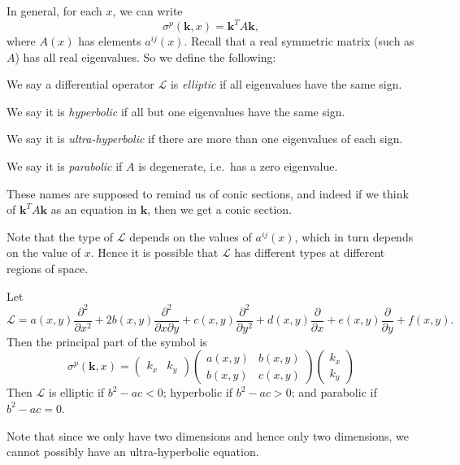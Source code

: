 \documentclass[a4paper]{article}
\begin{document}
In general, for each $x$, we can write
\[
  \sigma^p (\mathbf{k}, x) = \mathbf{k}^T A\mathbf{k},
\]
where $A(x)$ has elements $a^{ij}(x)$. Recall that a real symmetric matrix (such as $A$) has all real eigenvalues. So we define the following:

\begin{defi}
  We say a differential operator $\mathcal{L}$ is \emph{elliptic} if all eigenvalues have the same sign.

  We say it is \emph{hyperbolic} if all but one eigenvalues have the same sign.

  We say it is \emph{ultra-hyperbolic} if there are more than one eigenvalues of each sign.

  We say it is \emph{parabolic} if $A$ is degenerate, i.e.\ has a zero eigenvalue.
\end{defi}
These names are supposed to remind us of conic sections, and indeed if we think of $\mathbf{k}^T A\mathbf{k}$ as an equation in $\mathbf{k}$, then we get a conic section.

Note that the type of $\mathcal{L}$ depends on the values of $a^{ij}(x)$, which in turn depends on the value of $x$. Hence it is possible that $\mathcal{L}$ has different types at different regions of space.

\begin{eg}
  Let
  \[
    \mathcal{L} = a(x, y) \frac{\partial^2}{\partial x^2} + 2b(x, y) \frac{\partial^2}{\partial x \partial y} + c(x, y) \frac{\partial^2}{\partial y^2} + d(x, y) \frac{\partial}{\partial x} + e(x, y) \frac{\partial}{\partial y} + f(x, y).
  \]
  Then the principal part of the symbol is
  \[
    \sigma^p(\mathbf{k}, x) =
    \begin{pmatrix}
      k_x & k_y
    \end{pmatrix}
    \begin{pmatrix}
      a(x, y) & b(x, y)\\
      b(x, y) & c(x, y)
    \end{pmatrix}
    \begin{pmatrix}
      k_x \\ k_y
    \end{pmatrix}
  \]
  Then $\mathcal{L}$ is elliptic if $b^2 - ac < 0$; hyperbolic if $b^2 - ac > 0$; and parabolic if $b^2 - ac = 0$.

  Note that since we only have two dimensions and hence only two dimensions, we cannot possibly have an ultra-hyperbolic equation.
\end{eg}
\end{document}
